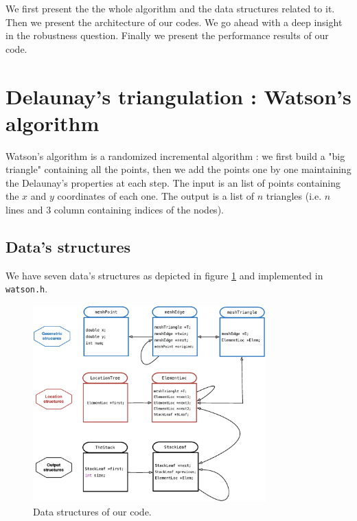We first present the the whole algorithm and the data structures related to it. Then we present the architecture of our codes. We go ahead with a deep insight in the robustness question. Finally we present the performance results of our code. 


\newpage
\section{Delaunay's triangulation : Watson's algorithm}
Watson's algorithm \cite{de2000computational} is a randomized incremental algorithm : we first build a "big triangle" containing all the points, then we add the points one by one maintaining the Delaunay's properties at each step. The input is an list of points containing the $x$ and $y$ coordinates of each one. The output is a list of $n$ triangles (i.e. $n$ lines and $3$ column containing indices of the nodes).

\subsection*{Data's structures}
We have seven data's structures as depicted in figure \ref{fig:dataStruct} and implemented in \texttt{watson.h}.

\begin{figure}[h!]
\centering
\includegraphics[width=0.8\textwidth]{images/dataStruct.eps}
\caption{Data structures of our code.}
\label{fig:dataStruct}
\end{figure}

